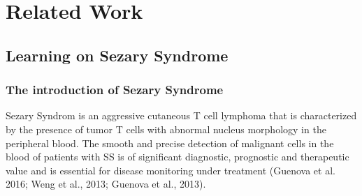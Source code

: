 \chapter{Related Work}

\section{Learning on Sezary Syndrome}
\subsection{ The introduction of Sezary Syndrome } %
Sezary Syndrom is an aggressive cutaneous T cell lymphoma that is characterized by the presence of tumor T cells with abnormal nucleus morphology in the peripheral blood. The smooth and precise detection of malignant cells in the blood of patients with SS is of significant diagnostic, prognostic and therapeutic value and is essential for disease monitoring under treatment (Guenova et al. 2016; Weng et al., 2013; Guenova et al., 2013).















